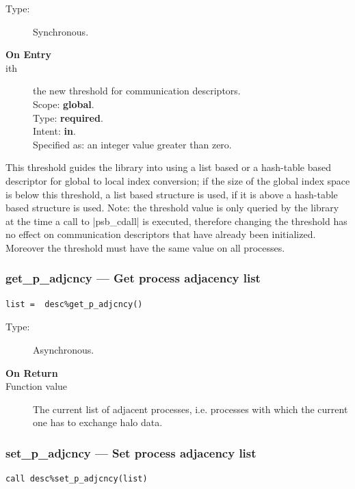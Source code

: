 \begin{description}
\item[Type:] Synchronous.
\item[\bf On Entry]
\item[ith] the new threshold for communication descriptors.\\
Scope: {\bf global}.\\
Type: {\bf required}.\\
Intent: {\bf in}.\\
Specified as: an integer value greater than zero.
\end{description}
This threshold guides the library into using a list based or a
hash-table based descriptor for global to local index conversion;
if the size of the global index space is below this threshold, a list
based structure is used, if it is above a hash-table based structure
is used. 
Note: the threshold value is only queried by the library at the time a
call to \fortinline|psb_cdall| is executed, therefore changing the threshold
has no effect on communication descriptors that have already been
initialized. Moreover the threshold must have the same value on all
processes. 


\subsubsection{get\_p\_adjcncy --- Get process adjacency list}

\begin{verbatim}
list =  desc%get_p_adjcncy()
\end{verbatim}

\begin{description}
\item[Type:] Asynchronous.
\item[\bf On Return]
\item[Function value] The current list of adjacent processes,
  i.e. processes with which the current one has to exchange halo
  data. 

\end{description}

\subsubsection{set\_p\_adjcncy --- Set process adjacency list}

\begin{verbatim}
call desc%set_p_adjcncy(list)
\end{verbatim}


